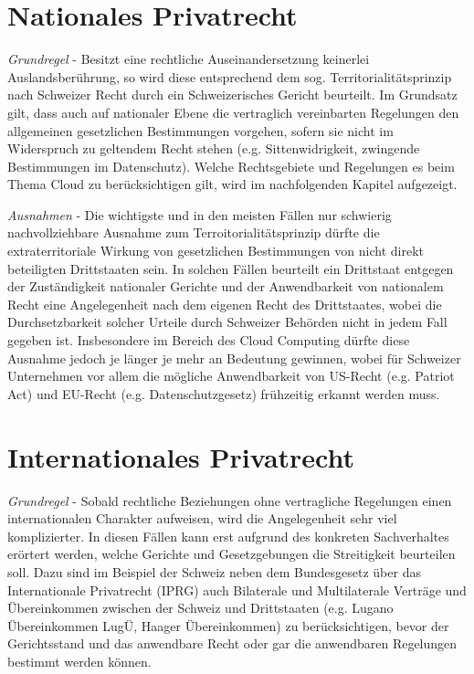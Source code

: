 \documentclass[a4paper,pointlessnumbers]{scrreprt}
\begin{document}
\section{Nationales Privatrecht}
\textit{Grundregel} - Besitzt eine rechtliche Auseinandersetzung keinerlei Auslandsberührung, so wird diese entsprechend dem sog. Territorialitätsprinzip nach Schweizer Recht durch ein Schweizerisches Gericht beurteilt. Im Grundsatz gilt, dass auch auf nationaler Ebene die vertraglich vereinbarten Regelungen den allgemeinen gesetzlichen Bestimmungen vorgehen, sofern sie nicht im Widerspruch zu geltendem Recht stehen (e.g. Sittenwidrigkeit, zwingende Bestimmungen im Datenschutz). Welche Rechtsgebiete und Regelungen es beim Thema Cloud zu berücksichtigen gilt, wird im nachfolgenden Kapitel aufgezeigt.

\textit{Ausnahmen} - Die wichtigste und in den meisten Fällen nur schwierig nachvollziehbare Ausnahme zum Terroitorialitätsprinzip dürfte die extraterritoriale Wirkung von gesetzlichen Bestimmungen von nicht direkt beteiligten Drittstaaten sein. In solchen Fällen beurteilt ein Drittstaat entgegen der Zuständigkeit nationaler Gerichte und der Anwendbarkeit von nationalem Recht eine Angelegenheit nach dem eigenen Recht des Drittstaates, wobei die Durchsetzbarkeit solcher Urteile durch Schweizer Behörden nicht in jedem Fall gegeben ist. Insbesondere im Bereich des Cloud Computing dürfte diese Ausnahme jedoch je länger je mehr an Bedeutung gewinnen, wobei für Schweizer Unternehmen vor allem die mögliche Anwendbarkeit von US-Recht (e.g. Patriot Act) und EU-Recht (e.g. Datenschutzgesetz) frühzeitig erkannt werden muss.

\section{Internationales Privatrecht}
\textit{Grundregel} - Sobald rechtliche Beziehungen ohne vertragliche Regelungen einen internationalen Charakter aufweisen, wird die Angelegenheit sehr viel komplizierter. In diesen Fällen kann erst aufgrund des konkreten Sachverhaltes erörtert werden, welche Gerichte und Gesetzgebungen die Streitigkeit beurteilen soll. Dazu sind im Beispiel der Schweiz neben dem Bundesgesetz über das Internationale Privatrecht (IPRG) auch Bilaterale und Multilaterale Verträge und Übereinkommen zwischen der Schweiz und Drittstaaten (e.g. Lugano Übereinkommen LugÜ, Haager Übereinkommen) zu berücksichtigen, bevor der Gerichtsstand und das anwendbare Recht oder gar die anwendbaren Regelungen bestimmt werden können.
\end{document}
